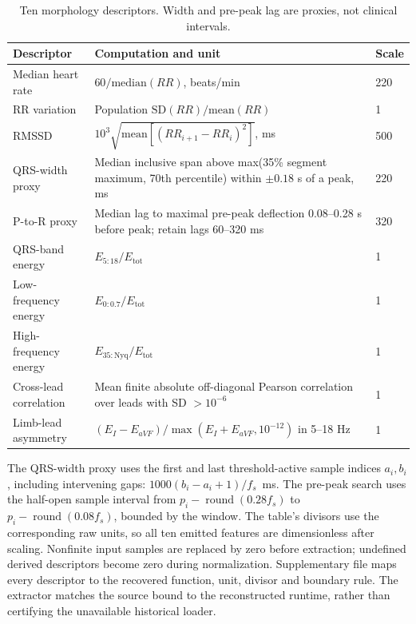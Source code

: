 \documentclass[life,article,submit,moreauthors]{Definitions/mdpi}
\begin{document}
\begin{table}[htbp]
\caption{Ten morphology descriptors. Width and pre-peak lag are proxies, not clinical intervals.\label{tab:morphology}}
\centering\small
\begin{tabular}{@{}p{.25\linewidth}p{.57\linewidth}p{.12\linewidth}@{}}
\toprule
Descriptor & Computation and unit & Scale \\
\midrule
Median heart rate & $60/\mathrm{median}(RR)$, beats/min & 220 \\
RR variation & Population $\mathrm{SD}(RR)/\mathrm{mean}(RR)$ & 1 \\
RMSSD & $10^3\sqrt{\mathrm{mean}[(RR_{i+1}-RR_i)^2]}$, ms & 500 \\
QRS-width proxy & Median inclusive span above max(35\% segment maximum, 70th percentile) within $\pm0.18$ s of a peak, ms & 220 \\
P-to-R proxy & Median lag to maximal pre-peak deflection 0.08--0.28 s before peak; retain lags 60--320 ms & 320 \\
QRS-band energy & $E_{5:18}/E_{\mathrm{tot}}$ & 1 \\
Low-frequency energy & $E_{0:0.7}/E_{\mathrm{tot}}$ & 1 \\
High-frequency energy & $E_{35:\mathrm{Nyq}}/E_{\mathrm{tot}}$ & 1 \\
Cross-lead correlation & Mean finite absolute off-diagonal Pearson correlation over leads with SD $>10^{-6}$ & 1 \\
Limb-lead asymmetry & $(E_I-E_{aVF})/\max(E_I+E_{aVF},10^{-12})$ in 5--18 Hz & 1 \\
\bottomrule
\end{tabular}
\end{table}

The QRS-width proxy uses the first and last threshold-active sample indices $a_i,b_i$, including intervening gaps: $1000(b_i-a_i+1)/f_s$~ms. The pre-peak search uses the half-open sample interval from $p_i-\operatorname{round}(0.28f_s)$ to $p_i-\operatorname{round}(0.08f_s)$, bounded by the window. The table's divisors use the corresponding raw units, so all ten emitted features are dimensionless after scaling. Nonfinite input samples are replaced by zero before extraction; undefined derived descriptors become zero during normalization. Supplementary file  maps every descriptor to the recovered function, unit, divisor and boundary rule. The extractor matches the source bound to the reconstructed runtime, rather than certifying the unavailable historical loader.
\end{document}
